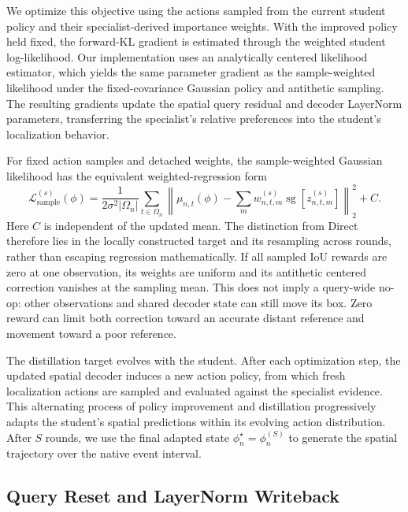 \documentclass[10pt,twocolumn,letterpaper]{article}
\begin{document}
We optimize this objective using the actions sampled from
the current student policy and their specialist-derived
importance weights. With the improved policy held fixed,
the forward-KL gradient is estimated through the weighted
student log-likelihood. Our implementation uses an
analytically centered likelihood estimator, which yields
the same parameter gradient as the sample-weighted
likelihood under the fixed-covariance Gaussian policy
and antithetic sampling. The resulting gradients update
the spatial query residual and decoder LayerNorm parameters,
transferring the specialist's relative preferences into
the student's localization behavior.

For fixed action samples and detached weights, the sample-weighted
Gaussian likelihood has the equivalent weighted-regression form
\begin{equation}
\mathcal L_{\mathrm{sample}}^{(s)}(\phi)
=\frac{1}{2\sigma^2|\Omega_n|}
\sum_{t\in\Omega_n}\left\|\mu_{n,t}(\phi)
-\sum_m w_{n,t,m}^{(s)}\operatorname{sg}[z_{n,t,m}^{(s)}]\right\|_2^2+C.
\label{eq:weighted-regression}
\end{equation}
Here $C$ is independent of the updated mean. The distinction from Direct
therefore lies in the locally constructed target and its resampling across
rounds, rather than escaping regression mathematically. If all sampled IoU
rewards are zero at one observation, its weights are uniform and its
antithetic centered correction vanishes at the sampling mean. This does
not imply a query-wide no-op: other observations and shared decoder state
can still move its box. Zero reward can limit both correction toward an
accurate distant reference and movement toward a poor reference.

The distillation target evolves with the student.
After each optimization step, the updated spatial decoder
induces a new action policy, from which fresh localization
actions are sampled and evaluated against the specialist
evidence. This alternating process of policy improvement
and distillation progressively adapts the student's spatial
predictions within its evolving action distribution. After
$S$ rounds, we use the final adapted state
$\phi_n^\star=\phi_n^{(S)}$ to generate the spatial trajectory
over the native event interval.



\subsection{Query Reset and LayerNorm Writeback}
\label{sec:state-lifecycle}
\end{document}
